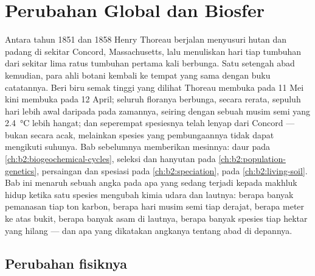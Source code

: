 \chapter{Perubahan Global dan Biosfer}\label{ch:b2:global-change}

Antara tahun 1851 dan 1858 Henry Thoreau berjalan menyusuri hutan dan
padang di sekitar Concord, Massachusetts, lalu menuliskan hari tiap
tumbuhan dari sekitar lima ratus tumbuhan pertama kali berbunga. Satu
setengah abad kemudian, para ahli botani kembali ke tempat yang sama
dengan buku catatannya. Beri biru semak tinggi yang dilihat Thoreau
membuka pada 11 Mei kini membuka pada 12 April; seluruh floranya
berbunga, secara rerata, sepuluh hari lebih awal daripada pada zamannya,
seiring dengan sebuah musim semi yang \qty{2.4}{\celsius} lebih hangat;
dan seperempat spesiesnya telah lenyap dari Concord --- bukan secara
acak, melainkan spesies yang pembungaannya tidak dapat mengikuti
suhunya. Bab sebelumnya memberikan mesinnya: daur pada
\cref{ch:b2:biogeochemical-cycles}, seleksi dan hanyutan pada
\cref{ch:b2:population-genetics}, persaingan dan spesiasi pada
\cref{ch:b2:speciation},  pada \cref{ch:b2:living-soil}. Bab ini
menaruh sebuah angka pada apa yang sedang terjadi kepada makhluk hidup
ketika satu spesies mengubah kimia udara dan lautnya: berapa banyak
pemanasan tiap ton karbon, berapa hari musim semi tiap derajat, berapa
meter ke atas bukit, berapa banyak asam di lautnya, berapa banyak
spesies tiap hektar yang hilang --- dan apa yang dikatakan angkanya
tentang abad di depannya.

\section{Perubahan fisiknya}

